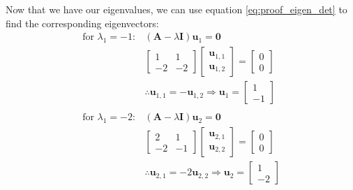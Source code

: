 \documentclass[a4paper,12pt]{book}
\newcommand{\matrx}[1]{\bm{#1}}
\newcommand{\vectr}[1]{\textbf{#1}}
\begin{document}
	Now that we have our eigenvalues, we can use equation \ref{eq:proof_eigen_det} to find the corresponding eigenvectors:
	\begin{align}
		\text{for } \lambda_1 = -1:&
		(\matrx{A} - \lambda \matrx{I}) \vectr{u}_1 = \vectr{0} \\
		& \begin{bmatrix}
			1 & 1 \\
			-2 & -2
		\end{bmatrix} \begin{bmatrix}
			\vectr{u}_{1,1} \\
			\vectr{u}_{1,2}
		\end{bmatrix} = \begin{bmatrix}
			0 \\
			0
		\end{bmatrix} \\
		&\therefore \vectr{u}_{1,1} = -\vectr{u}_{1,2} \Rightarrow \vectr{u}_1 = \begin{bmatrix}
			1 \\
			-1
		\end{bmatrix} \\ \\
		\text{for } \lambda_1 = -2:&
		(\matrx{A} - \lambda \matrx{I}) \vectr{u}_2 = \vectr{0} \\
		& \begin{bmatrix}
			2 & 1 \\
			-2 & -1
		\end{bmatrix} \begin{bmatrix}
			\vectr{u}_{2,1} \\
			\vectr{u}_{2,2}
		\end{bmatrix} = \begin{bmatrix}
			0 \\
			0
		\end{bmatrix} \\
		&\therefore \vectr{u}_{2,1} = -2 \vectr{u}_{2,2} \Rightarrow \vectr{u}_2 = \begin{bmatrix}
			1 \\
			-2
		\end{bmatrix}
	\end{align}
	
\end{document}
